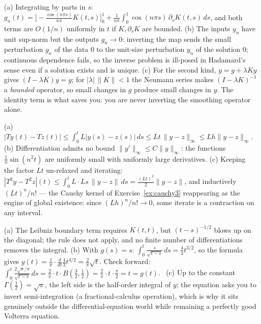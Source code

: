 \documentclass{essay}
\begin{document}
\begin{description}[leftmargin=0pt, itemsep=6pt]
  \item[\ref{ex:illposed}.] (a) Integrating by parts in $s$: $g_n(t) = \bigl[-\tfrac{\cos(n\pi s)}{n\pi}K(t,s)\bigr]_0^1 + \tfrac{1}{n\pi}\int_0^1 \cos(n\pi s)\,\partial_s K(t,s)\,ds$, and both terms are $O(1/n)$ uniformly in $t$ if $K, \partial_s K$ are bounded. (b) The inputs $y_n$ have unit sup-norm but the outputs $g_n \to 0$: inverting the map sends the small perturbation $g_n$ of the data $0$ to the unit-size perturbation $y_n$ of the solution $0$; continuous dependence fails, so the inverse problem is ill-posed in Hadamard's sense even if a solution exists and is unique. (c) For the second kind, $y = g + \lambda K y$ gives $(I - \lambda K)y = g$; for $|\lambda|\,\|K\| < 1$ the Neumann series makes $(I - \lambda K)^{-1}$ a \emph{bounded} operator, so small changes in $g$ produce small changes in $y$. The identity term is what saves you: you are never inverting the smoothing operator alone.

  \item[\ref{ex:contraction}.] (a) $|Ty(t) - Tz(t)| \le \int_0^t L|y(s)-z(s)|\,ds \le Lt\,\|y - z\|_\infty \le Lh\|y-z\|_\infty$. (b) Differentiation admits no bound $\|y'\|_\infty \le C\|y\|_\infty$: the functions $\tfrac1n\sin(n^2 t)$ are uniformly small with uniformly large derivatives. (c) Keeping the factor $Lt$ un-relaxed and iterating: $|T^2y - T^2z|(t) \le \int_0^t L \cdot Ls\,\|y-z\|\,ds = \tfrac{(Lt)^2}{2}\|y-z\|$, and inductively $(Lt)^n/n!$ --- the Cauchy kernel of Exercise~\ref{ex:cauchy3} reappearing as the engine of global existence: since $(Lh)^n/n! \to 0$, some iterate is a contraction on any interval.

  \item[\ref{ex:abel}.] (a) The Leibniz boundary term requires $K(t,t)$, but $(t-s)^{-1/2}$ blows up on the diagonal; the rule does not apply, and no finite number of differentiations removes the integral. (b) With $g(s) = s$: $\int_0^t \frac{s}{\sqrt{t-s}}\,ds = \tfrac{4}{3}t^{3/2}$, so the formula gives $y(t) = \tfrac{1}{\pi}\cdot\tfrac{d}{dt}\tfrac{4}{3}t^{3/2} = \tfrac{2}{\pi}\sqrt{t}$. Check forward: $\int_0^t \frac{2\sqrt{s}/\pi}{\sqrt{t-s}}\,ds = \tfrac{2}{\pi}\cdot t \cdot B(\tfrac32, \tfrac12) = \tfrac{2}{\pi} \cdot t \cdot \tfrac{\pi}{2} = t = g(t)$. \checkmark\ (c) Up to the constant $\Gamma(\tfrac12) = \sqrt{\pi}$, the left side is the half-order integral of $y$; the equation asks you to invert semi-integration (a fractional-calculus operation), which is why it sits genuinely outside the differential-equation world while remaining a perfectly good Volterra equation.

\end{description}
\end{document}

